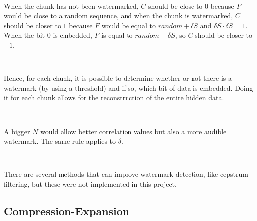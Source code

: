 ~

When the chunk has not been watermarked, $C$ should be close to $0$ because $F$ would be close to a random sequence, and when the chunk is watermarked, $C$ should be closer to $1$ because $F$ would be equal to $random + \delta S$ and $\delta S \cdot \delta S = 1$. When the bit 0 is embedded, $F$ is equal to $random - \delta S$, so $C$ should be closer to $-1$.

~

Hence, for each chunk, it is possible to determine whether or not there is a watermark (by using a threshold) and if so, which bit of data is embedded. Doing it for each chunk allows for the reconstruction of the entire hidden data.

~

A bigger $N$ would allow better correlation values but also a more audible watermark. The same rule applies to $\delta$.

~

There are several methods that can improve watermark detection, like cepstrum filtering, but these were not implemented in this project.

\subsection{Compression-Expansion}
